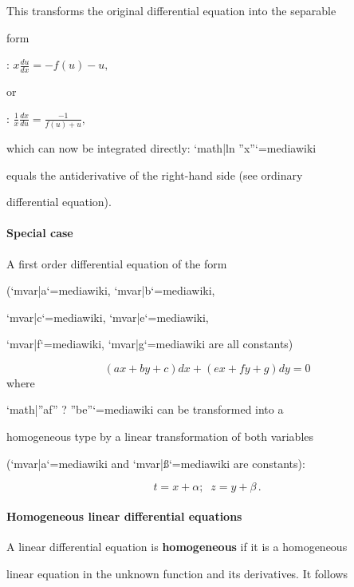 This transforms the original differential equation into the separable

form



:   $x\frac{du}{dx} = -f(u) - u,$



or



:   $\frac 1x\frac{dx}{du} = \frac {-1}{f(u) + u},$



which can now be integrated directly: `{{math|ln ''x''}}`{=mediawiki}

equals the antiderivative of the right-hand side (see ordinary

differential equation).



\paragraph{Special case}



A first order differential equation of the form

(`{{mvar|a}}`{=mediawiki}, `{{mvar|b}}`{=mediawiki},

`{{mvar|c}}`{=mediawiki}, `{{mvar|e}}`{=mediawiki},

`{{mvar|f}}`{=mediawiki}, `{{mvar|g}}`{=mediawiki} are all constants)



$$\left(ax + by + c\right) dx + \left(ex + fy + g\right) dy = 0$$ where

`{{math|''af'' ? ''be''}}`{=mediawiki} can be transformed into a

homogeneous type by a linear transformation of both variables

(`{{mvar|a}}`{=mediawiki} and `{{mvar|ß}}`{=mediawiki} are constants):



$$t = x + \alpha; \; \; z = y + \beta \,.$$



\paragraph{Homogeneous linear differential equations}



A linear differential equation is \textbf{homogeneous} if it is a homogeneous

linear equation in the unknown function and its derivatives. It follows

